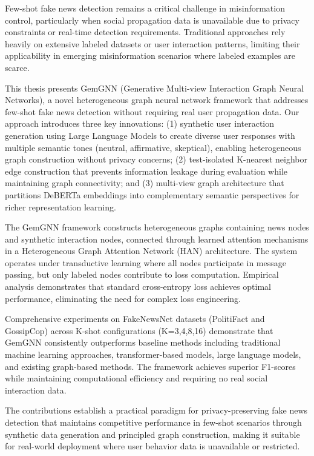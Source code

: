 \StartAbstract

Few-shot fake news detection remains a critical challenge in misinformation control, particularly when social propagation data is unavailable due to privacy constraints or real-time detection requirements. Traditional approaches rely heavily on extensive labeled datasets or user interaction patterns, limiting their applicability in emerging misinformation scenarios where labeled examples are scarce.

This thesis presents GemGNN (Generative Multi-view Interaction Graph Neural Networks), a novel heterogeneous graph neural network framework that addresses few-shot fake news detection without requiring real user propagation data. Our approach introduces three key innovations: (1) synthetic user interaction generation using Large Language Models to create diverse user responses with multiple semantic tones (neutral, affirmative, skeptical), enabling heterogeneous graph construction without privacy concerns; (2) test-isolated K-nearest neighbor edge construction that prevents information leakage during evaluation while maintaining graph connectivity; and (3) multi-view graph architecture that partitions DeBERTa embeddings into complementary semantic perspectives for richer representation learning.

The GemGNN framework constructs heterogeneous graphs containing news nodes and synthetic interaction nodes, connected through learned attention mechanisms in a Heterogeneous Graph Attention Network (HAN) architecture. The system operates under transductive learning where all nodes participate in message passing, but only labeled nodes contribute to loss computation. Empirical analysis demonstrates that standard cross-entropy loss achieves optimal performance, eliminating the need for complex loss engineering.

Comprehensive experiments on FakeNewsNet datasets (PolitiFact and GossipCop) across K-shot configurations (K=3,4,8,16) demonstrate that GemGNN consistently outperforms baseline methods including traditional machine learning approaches, transformer-based models, large language models, and existing graph-based methods. The framework achieves superior F1-scores while maintaining computational efficiency and requiring no real social interaction data.

The contributions establish a practical paradigm for privacy-preserving fake news detection that maintains competitive performance in few-shot scenarios through synthetic data generation and principled graph construction, making it suitable for real-world deployment where user behavior data is unavailable or restricted.

\EndAbstract
